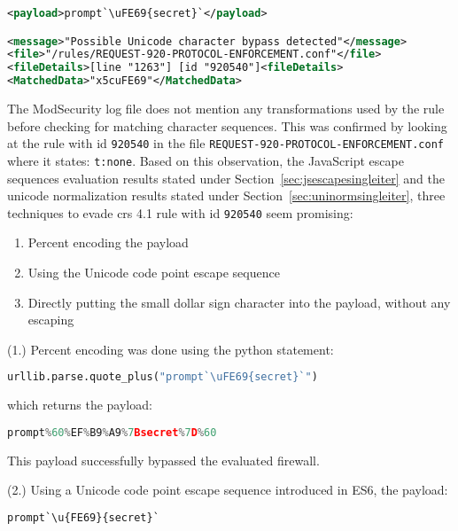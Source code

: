 \begin{lstlisting}[style=ruleStyle, language=XML]
<payload>prompt`\uFE69{secret}`</payload>

<message>"Possible Unicode character bypass detected"</message>
<file>"/rules/REQUEST-920-PROTOCOL-ENFORCEMENT.conf"</file>
<fileDetails>[line "1263"] [id "920540"]<fileDetails>
<MatchedData>"x5cuFE69"</MatchedData>
\end{lstlisting}

The ModSecurity log file does not mention any transformations used by the rule before checking for matching character sequences. This was confirmed by looking at the rule with id \verb|920540| in the file \verb|REQUEST-920-PROTOCOL-ENFORCEMENT.conf| where it states: \verb|t:none|. Based on this observation, the JavaScript escape sequences evaluation results stated under Section~\ref{sec:jsescapesingleiter} and the unicode normalization results stated under Section~\ref{sec:uninormsingleiter}, three techniques to evade \acrshort{crs} 4.1 rule with id \verb|920540| seem promising:

\begin{enumerate}
	\item Percent encoding the payload
	\item Using the Unicode code point escape sequence
	\item Directly putting the small dollar sign character into the payload, without any escaping
\end{enumerate}

(1.) Percent encoding was done using the python statement:

\begin{lstlisting}[style=basicStyle, language=Python]
urllib.parse.quote_plus("prompt`\uFE69{secret}`")
\end{lstlisting}

which returns the payload:

\begin{lstlisting}[style=basicStyle, language=Python]
prompt%60%EF%B9%A9%7Bsecret%7D%60
\end{lstlisting}

This payload successfully bypassed the evaluated firewall.

(2.) Using a Unicode code point escape sequence introduced in ES6, the payload:

\begin{lstlisting}[style=basicStyle, language=Python]
prompt`\u{FE69}{secret}`
\end{lstlisting}

